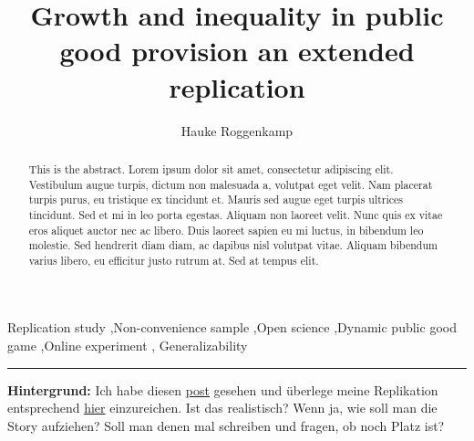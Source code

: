 \documentclass[
  authoryear,
  preprint,
  3p]{elsarticle}
\begin{document}
\begin{frontmatter}
\title{Growth and inequality in public good provision \textbar{} an
extended replication}
\author[1,2]{Hauke Roggenkamp%
%
}



        
\begin{abstract}
This is the abstract. Lorem ipsum dolor sit amet, consectetur adipiscing
elit. Vestibulum augue turpis, dictum non malesuada a, volutpat eget
velit. Nam placerat turpis purus, eu tristique ex tincidunt et. Mauris
sed augue eget turpis ultrices tincidunt. Sed et mi in leo porta
egestas. Aliquam non laoreet velit. Nunc quis ex vitae eros aliquet
auctor nec ac libero. Duis laoreet sapien eu mi luctus, in bibendum leo
molestie. Sed hendrerit diam diam, ac dapibus nisl volutpat vitae.
Aliquam bibendum varius libero, eu efficitur justo rutrum at. Sed at
tempus elit.
\end{abstract}





\begin{keyword}
    Replication study \sep Non-convenience sample \sep Open
science \sep Dynamic public good game \sep Online experiment \sep 
    Generalizability
\end{keyword}
\end{frontmatter}\ifdefined\Shaded\renewenvironment{Shaded}{\begin{tcolorbox}[breakable, boxrule=0pt, borderline west={3pt}{0pt}{shadecolor}, frame hidden, interior hidden, sharp corners, enhanced]}{\end{tcolorbox}}\fi

\begin{center}\rule{0.5\linewidth}{0.5pt}\end{center}

\textbf{Hintergrund:} Ich habe diesen
\href{https://groups.google.com/g/esa-announce/c/-_2OmbkdxEk}{post}
gesehen und überlege meine Replikation entsprechend
\href{https://www.sciencedirect.com/journal/journal-of-behavioral-and-experimental-economics/about/call-for-papers\#transparency-reproducibility-and-generalizability-of-behavioral-economics-experiments}{hier}
einzureichen. Ist das realistisch? Wenn ja, wie soll man die Story
aufziehen? Soll man denen mal schreiben und fragen, ob noch Platz ist?
\end{document}
